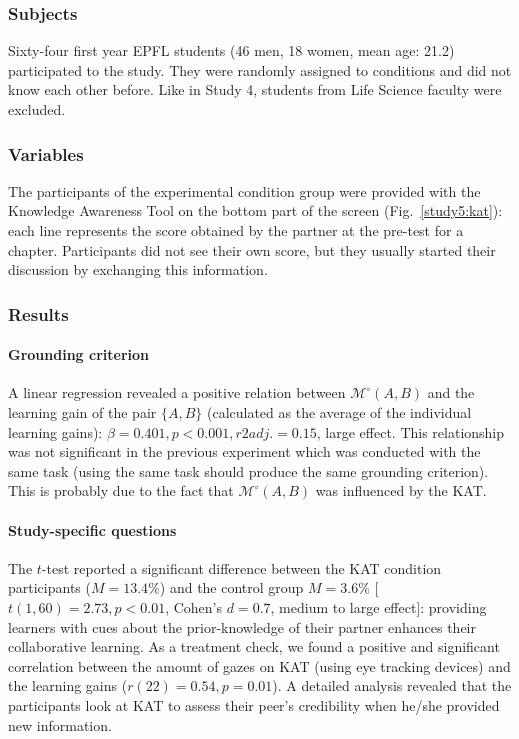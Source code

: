 \documentclass[natbib]{svjour3}
\newcommand{\gModel}[2]{{$\mathcal{M}^{\circ}(#1, #2)$}}
\begin{document}
\subsubsection*{Subjects}

Sixty-four first year EPFL students (46 men, 18 women, mean age: 21.2)
participated to the study. They were randomly assigned to conditions and
did not know each other before. Like in Study 4, students from Life Science
faculty were excluded.

\subsubsection*{Variables}

The participants of the experimental condition group were provided with the
Knowledge Awareness Tool on the bottom part of the screen
(Fig.~\ref{study5:kat}): each line represents the score obtained by the partner
at the pre-test for a chapter. Participants did not see their own score, but they
usually started their discussion by exchanging this information.

\subsubsection*{Results}

\paragraph{Grounding criterion} A linear regression revealed a positive relation
between \gModel{A}{B} and the learning gain of the pair $\{A, B\}$ (calculated
as the average of the individual learning gains): $\beta= 0.401, p < 0.001, r2adj.
= 0.15$, large effect. This relationship was not significant in the previous
experiment which was conducted with the same task (using the same task
should produce the same grounding criterion). This is probably due to the fact that
\gModel{A}{B} was influenced by the KAT.

\paragraph{Study-specific questions} The $t$-test reported a significant
difference between the KAT condition participants ($M = 13.4\%$) and the control
group $M = 3.6\%$ [$t(1, 60) = 2.73, p < 0.01$, Cohen's $d = 0.7$, medium to large
effect]: providing learners with cues about the prior-knowledge of their partner
enhances their collaborative learning. As a treatment check, we found a positive
and significant correlation between the amount of gazes on KAT (using eye
tracking devices) and the learning gains ($r(22) = 0.54, p = 0.01$). A detailed
analysis revealed that the participants look at KAT to assess their peer's credibility
when he/she provided new information. 
\end{document}
